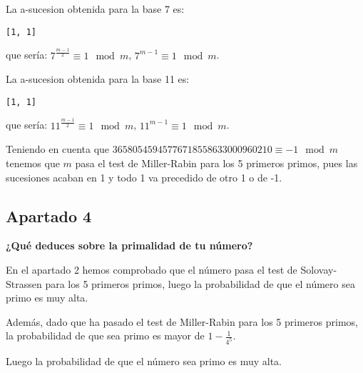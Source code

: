 \documentclass[a4paper]{article}
\begin{document}
La a-sucesion obtenida para la base 7 es:
\begin{verbatim}
[1, 1]
\end{verbatim}
que sería: $7^{\frac{m-1}{2}}\equiv 1\mod m$, $7^{m-1}\equiv 1\mod m$.

La a-sucesion obtenida para la base 11 es:
\begin{verbatim}
[1, 1]
\end{verbatim}
que sería: $11^{\frac{m-1}{2}}\equiv 1\mod m$, $11^{m-1}\equiv 1\mod m$.

Teniendo en cuenta que $36580545945776718558633000960210\equiv -1\mod m$ tenemos que $m$ pasa el test de Miller-Rabin para los 5 primeros primos, pues las sucesiones acaban en 1 y todo 1 va precedido de otro 1 o de -1.


\subsection{Apartado 4}
\textbf{¿Qué deduces sobre la primalidad de tu número?}

En el apartado 2 hemos comprobado que el número pasa el test de Solovay-Strassen para los 5 primeros primos, luego la probabilidad de que el número sea primo es muy alta.

Además, dado que ha pasado el test de Miller-Rabin para los 5 primeros primos, la probabilidad de que sea primo es mayor de $1-\frac{1}{4^5}$.

Luego la probabilidad de que el número sea primo es muy alta.
\end{document}
